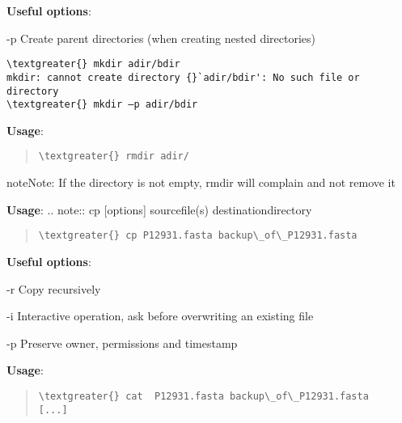 \documentclass[letterpaper,10pt,english]{sphinxmanual}
\begin{document}
\textbf{Useful options}:
\begin{optionlist}{3cm}
\item [-p]  
Create parent directories (when creating nested directories)

\begin{Verbatim}[commandchars=\\\{\}]
\textgreater{} mkdir adir/bdir
mkdir: cannot create directory {}`adir/bdir': No such file or directory
\textgreater{} mkdir –p adir/bdir
\end{Verbatim}
\end{optionlist}

\textbf{Usage}:  
\begin{quote}

\begin{Verbatim}[commandchars=\\\{\}]
\textgreater{} rmdir adir/
\end{Verbatim}
\end{quote}

\begin{notice}{note}{Note:}
If the directory is not empty, rmdir will complain and not remove it
\end{notice}

\textbf{Usage}:  
.. note:: cp {[}options{]} sourcefile(s) destinationdirectory
\begin{quote}

\begin{Verbatim}[commandchars=\\\{\}]
\textgreater{} cp P12931.fasta backup\_of\_P12931.fasta
\end{Verbatim}
\end{quote}

\textbf{Useful options}:
\begin{optionlist}{3cm}
\item [-r]  
Copy recursively
\item [-i]  
Interactive operation, ask before overwriting an existing file
\item [-p]  
Preserve owner, permissions and timestamp
\end{optionlist}

\textbf{Usage}:  
\begin{quote}

\begin{Verbatim}[commandchars=\\\{\}]
\textgreater{} cat  P12931.fasta backup\_of\_P12931.fasta
[...]
\end{Verbatim}
\end{quote}
\end{document}
